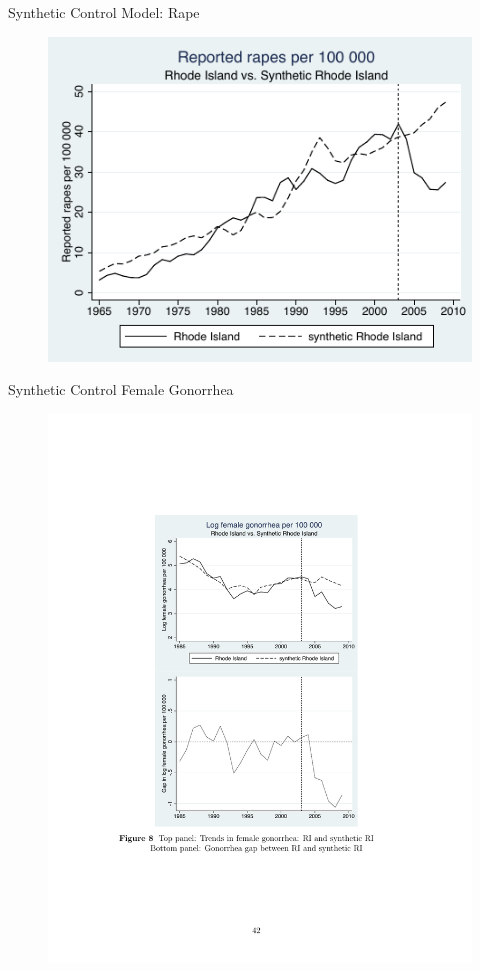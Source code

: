 \documentclass{beamer}
\begin{document}
\begin{frame}[shrink=20]{Synthetic Control Model: Rape}
\begin{figure}
\includegraphics[scale=1.25]{./lecture_includes/raperate_synthetic.pdf}
\end{figure}
\end{frame}

\begin{frame}[shrink=20]{Synthetic Control Female Gonorrhea}\label{sc_femgon}
\begin{figure}
\includegraphics{./lecture_includes/synth_gonorrhea_estimate}
\end{figure}
\end{frame}
\end{document}
